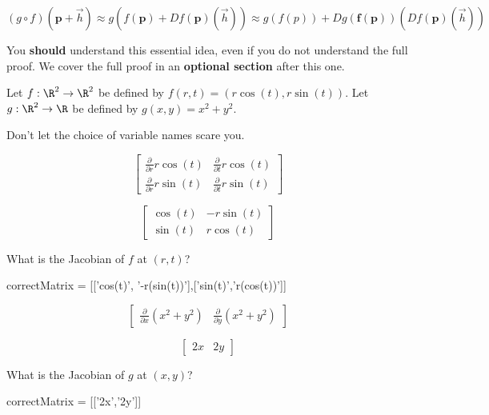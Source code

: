 \documentclass{ximera}
\begin{document}
\[
	(g \circ f)(\mathbf{p} +\vec{h}) \approx g(f(\mathbf{p}) + Df(\mathbf{p})(\vec{h})) \approx g(f(p)) + Dg(\mathbf{f(p)})(Df(\mathbf{p})(\vec{h}))
\]

You \textbf{should} understand this essential idea, even if you do not understand the full proof.  We cover the full proof in an \textbf{optional section} after this one.

\begin{question}
	Let $f:\R^2 \to \R^2$ be defined by $f(r,t) = (r\cos(t),r\sin(t))$.  Let $g:\R^2 \to \R$ be defined by $g(x,y) = x^2+y^2$. 
	
	Don't let the choice of variable names scare you.
	
	\begin{solution}
		\begin{hint}
			\[\begin{bmatrix}  
			\frac{\partial}{ \partial r} r\cos(t)& \frac{\partial}{ \partial t}  r\cos(t)
			\\  
			\frac{\partial}{ \partial r} r\sin(t)& \frac{\partial}{ \partial t} r\sin(t)
			\end{bmatrix}\]
		\end{hint}
		\begin{hint}
			\[\begin{bmatrix}  
			\cos(t) & -r\sin(t)
			\\  
			\sin(t) & r\cos(t)
			\end{bmatrix}\]
		\end{hint}
		What is the Jacobian of $f$ at $(r,t)$?
		\begin{matrix-answer}[name =J]
			correctMatrix = [['cos(t)', '-r(sin(t))'],['sin(t)','r(cos(t))']]
		\end{matrix-answer}
	\end{solution}
	
	\begin{solution}
		\begin{hint}
			 \[ \begin{bmatrix} \frac{\partial}{\partial x} (x^2+y^2)& \frac{\partial}{\partial y} (x^2+y^2) \end{bmatrix}\]
		\end{hint}
		\begin{hint}
			 \[ \begin{bmatrix} 2x & 2y \end{bmatrix}\]
		\end{hint}
		What is the Jacobian of $g$ at $(x,y)$?
		\begin{matrix-answer}
			correctMatrix = [['2x','2y']]
		\end{matrix-answer}
	\end{solution}
	

\end{question}
\end{document}
